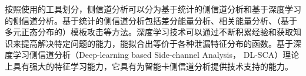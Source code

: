{	按照使用的工具划分，侧信道分析可以分为基于统计的侧信道分析和基于深度学习的侧信道分析。基于统计的侧信道分析包括差分能量分析、相关能量分析、（基于多元正态分布的）模板攻击等方法。深度学习技术可以通过不断积累经验和获取知识来提高解决特定问题的能力，能拟合出等价于各种泄漏特征分布的函数。基于深度学习侧信道分析（Deep-learning based Side-channel Analysis， DL-SCA）理论上具有强大的特征学习能力，它具有为智能卡侧信道分析提供技术支持的能力。
	{
%	
%	
%	
}

}
